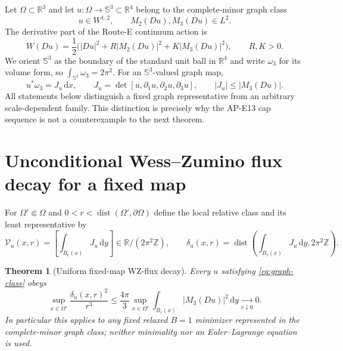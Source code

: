 \documentclass[11pt]{article}
\newtheorem{theorem}{Theorem}[section]
\newcommand{\dd}{\,\mathrm d}
\newcommand{\RR}{\mathbb R}
\newcommand{\SSS}{\mathbb S}
\newcommand{\dist}{\operatorname{dist}}
\begin{document}
Let $\Omega\subset\RR^3$ and let $u:\Omega\to\SSS^3\subset\RR^4$ belong to
the complete-minor graph class
\begin{equation}
 u\in W^{1,2},\qquad M_2(Du),M_3(Du)\in L^2.
 \label{eq:graph-class}
\end{equation}
The derivative part of the Route-E continuum action is
\begin{equation}
 W(Du)=\frac12\bigl(|Du|^2+R|M_2(Du)|^2+K|M_3(Du)|^2\bigr),
 \qquad R,K>0.
 \label{eq:W}
\end{equation}
We orient $\SSS^3$ as the boundary of the standard unit ball in $\RR^4$ and
write $\omega_3$ for its volume form, so
$\int_{\SSS^3}\omega_3=2\pi^2$.  For an $\SSS^3$-valued graph map,
\begin{equation}
 u^*\omega_3=J_u\dd x,\qquad
 J_u=\det[u,\partial_1u,\partial_2u,\partial_3u],\qquad
 |J_u|\leq |M_3(Du)|.
 \label{eq:Jbound}
\end{equation}
All statements below distinguish a fixed graph representative from an
arbitrary scale-dependent family.  This distinction is precisely why the
AP-E13 cap sequence is not a counterexample to the next theorem.

\section{Unconditional Wess--Zumino flux decay for a fixed map}

For $\Omega'\Subset\Omega$ and $0<r<\dist(\Omega',\partial\Omega)$ define the
local relative class and its least representative by
\begin{equation}
 \mathcal V_u(x,r)=\left[\int_{B_r(x)}J_u\dd y\right]
 \in\RR/(2\pi^2\mathbb Z),\qquad
 \delta_u(x,r)=\dist\left(\int_{B_r(x)}J_u\dd y,
                         2\pi^2\mathbb Z\right).
 \label{eq:local-flux}
\end{equation}

\begin{theorem}[Uniform fixed-map WZ-flux decay]
Every $u$ satisfying \eqref{eq:graph-class} obeys
\begin{equation}
 \boxed{\quad
 \sup_{x\in\Omega'}\frac{\delta_u(x,r)^2}{r^3}
 \leq \frac{4\pi}{3}
       \sup_{x\in\Omega'}\int_{B_r(x)}|M_3(Du)|^2\dd y
 \xrightarrow[r\downarrow0]{}0.\quad}
 \label{eq:wz-decay}
\end{equation}
In particular this applies to any fixed relaxed $B=1$ minimizer represented
in the complete-minor graph class; neither minimality nor an Euler--Lagrange
equation is used.
\end{theorem}
\end{document}
